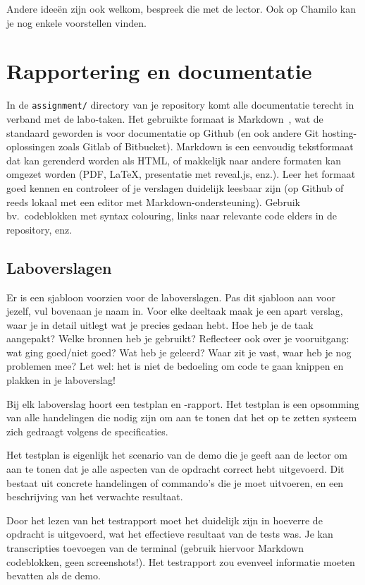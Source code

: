 Andere ideeën zijn ook welkom, bespreek die met de lector. Ook op Chamilo kan je nog enkele voorstellen vinden.

\section{Rapportering en documentatie}%
\label{sec:rapportering-en-documentatie}

In de \texttt{assignment/} directory van je repository komt alle documentatie terecht in verband met de labo-taken. Het gebruikte formaat is Markdown~\autocite{Gruber2004,Github2016}, wat de standaard geworden is voor documentatie op Github (en ook andere Git hosting-oplossingen zoals Gitlab of Bitbucket). Markdown is een eenvoudig tekstformaat dat kan gerenderd worden als HTML, of makkelijk naar andere formaten kan omgezet worden (PDF, {\LaTeX}, presentatie met reveal.js, enz.). Leer het formaat goed kennen en controleer of je verslagen duidelijk leesbaar zijn (op Github of reeds lokaal met een editor met Markdown-ondersteuning). Gebruik bv.\ codeblokken met syntax colouring, links naar relevante code elders in de repository, enz.

\subsection{Laboverslagen}%
\label{subs:laboverslagen}

Er is een sjabloon voorzien voor de laboverslagen. Pas dit sjabloon aan voor jezelf, vul bovenaan je naam in. Voor elke deeltaak maak je een apart verslag, waar je in detail uitlegt wat je precies gedaan hebt. Hoe heb je de taak aangepakt? Welke bronnen heb je gebruikt? Reflecteer ook over je vooruitgang: wat ging goed/niet goed? Wat heb je geleerd? Waar zit je vast, waar heb je nog problemen mee? Let wel: het is niet de bedoeling om code te gaan knippen en plakken in je laboverslag!

Bij elk laboverslag hoort een testplan en -rapport. Het testplan is een opsomming van alle handelingen die nodig zijn om aan te tonen dat het op te zetten systeem zich gedraagt volgens de specificaties.

Het testplan is eigenlijk het scenario van de demo die je geeft aan de lector om aan te tonen dat je alle aspecten van de opdracht correct hebt uitgevoerd. Dit bestaat uit concrete handelingen of commando's die je moet uitvoeren, en een beschrijving van het verwachte resultaat.

Door het lezen van het testrapport moet het duidelijk zijn in hoeverre de opdracht is uitgevoerd, wat het effectieve resultaat van de tests was. Je kan transcripties toevoegen van de terminal (gebruik hiervoor Markdown codeblokken, geen screenshots!). Het testrapport zou evenveel informatie moeten bevatten als de demo.

